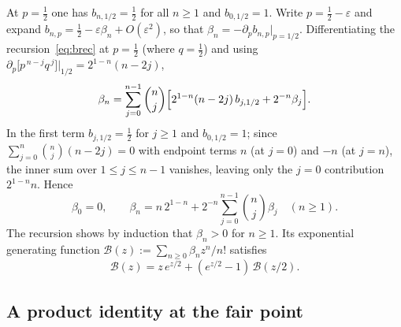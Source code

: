 \documentclass[11pt]{article}
\theoremstyle{definition}
\begin{document}
At $p=\tfrac12$ one has $b_{n,1/2}=\tfrac12$ for all $n\ge1$ and
$b_{0,1/2}=1$. Write $p=\tfrac12-\varepsilon$ and expand
$b_{n,p}=\tfrac12-\varepsilon\beta_n+O(\varepsilon^2)$, so that
$\beta_n=-\partial_pb_{n,p}\big|_{p=1/2}$. Differentiating the
recursion~\eqref{eq:brec} at $p=\tfrac12$ (where $q=\tfrac12$) and
using $\partial_p\bigl[p^{\,n-j}q^{\,j}\bigr]\big|_{1/2}
=2^{1-n}(n-2j)$,
\[
  \beta_n=\sum_{j=0}^{n-1}\binom nj\Bigl[2^{1-n}(n-2j)\,b_{j,1/2}
          +2^{-n}\beta_j\Bigr].
\]
In the first term $b_{j,1/2}=\tfrac12$ for $j\ge1$ and $b_{0,1/2}=1$;
since $\sum_{j=0}^{n}\binom nj(n-2j)=0$ with endpoint terms $n$ (at
$j=0$) and $-n$ (at $j=n$), the inner sum over $1\le j\le n-1$
vanishes, leaving only the $j=0$ contribution $2^{1-n}n$. Hence
\begin{equation}\label{eq:b1rec}
  \beta_0=0,\qquad
  \beta_n=n\,2^{1-n}+2^{-n}\sum_{j=0}^{n-1}\binom nj\beta_j
  \quad(n\ge1).
\end{equation}
The recursion shows by induction that $\beta_n>0$ for $n\ge1$. Its
exponential generating function $\mathcal B(z):=\sum_{n\ge0}
\beta_nz^n/n!$ satisfies
\begin{equation}\label{eq:B1func}
  \mathcal B(z)=z\,e^{z/2}+(e^{z/2}-1)\,\mathcal B(z/2).
\end{equation}

\subsection{A product identity at the fair point}
\end{document}
